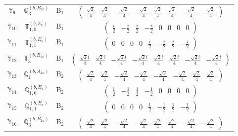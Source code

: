 \documentclass[fleqn,10pt,landscape]{article}
\begin{document}
\begin{itemize}
\begin{center}
\begin{longtable}{c|c|c|c}
$ \mathbb{Y}_{9} $ & $\mathbb{Q}_{3}^{(b,B_{2u})}$ & B$_{1}$ & $\begin{pmatrix} \frac{\sqrt{2}}{4} & \frac{\sqrt{2}}{4} & - \frac{\sqrt{2}}{4} & - \frac{\sqrt{2}}{4} & \frac{\sqrt{2}}{4} & \frac{\sqrt{2}}{4} & - \frac{\sqrt{2}}{4} & - \frac{\sqrt{2}}{4} \end{pmatrix}$ \\
$ \mathbb{Y}_{10} $ & $\mathbb{T}_{1,0}^{(b,E_{u})}$ & B$_{1}$ & $\begin{pmatrix} \frac{i}{2} & - \frac{i}{2} & \frac{i}{2} & - \frac{i}{2} & 0 & 0 & 0 & 0 \end{pmatrix}$ \\
$ \mathbb{Y}_{11} $ & $\mathbb{T}_{1,1}^{(b,E_{u})}$ & B$_{1}$ & $\begin{pmatrix} 0 & 0 & 0 & 0 & \frac{i}{2} & - \frac{i}{2} & \frac{i}{2} & - \frac{i}{2} \end{pmatrix}$ \\
$ \mathbb{Y}_{12} $ & $\mathbb{T}_{3}^{(b,B_{2u})}$ & B$_{1}$ & $\begin{pmatrix} \frac{\sqrt{2} i}{4} & \frac{\sqrt{2} i}{4} & - \frac{\sqrt{2} i}{4} & - \frac{\sqrt{2} i}{4} & \frac{\sqrt{2} i}{4} & \frac{\sqrt{2} i}{4} & - \frac{\sqrt{2} i}{4} & - \frac{\sqrt{2} i}{4} \end{pmatrix}$ \\ \hline
$ \mathbb{Y}_{13} $ & $\mathbb{Q}_{1}^{(b,A_{2u})}$ & B$_{2}$ & $\begin{pmatrix} \frac{\sqrt{2}}{4} & \frac{\sqrt{2}}{4} & - \frac{\sqrt{2}}{4} & - \frac{\sqrt{2}}{4} & - \frac{\sqrt{2}}{4} & - \frac{\sqrt{2}}{4} & \frac{\sqrt{2}}{4} & \frac{\sqrt{2}}{4} \end{pmatrix}$ \\
$ \mathbb{Y}_{14} $ & $\mathbb{Q}_{1,0}^{(b,E_{u})}$ & B$_{2}$ & $\begin{pmatrix} \frac{1}{2} & - \frac{1}{2} & \frac{1}{2} & - \frac{1}{2} & 0 & 0 & 0 & 0 \end{pmatrix}$ \\
$ \mathbb{Y}_{15} $ & $\mathbb{Q}_{1,1}^{(b,E_{u})}$ & B$_{2}$ & $\begin{pmatrix} 0 & 0 & 0 & 0 & \frac{1}{2} & - \frac{1}{2} & \frac{1}{2} & - \frac{1}{2} \end{pmatrix}$ \\
$ \mathbb{Y}_{16} $ & $\mathbb{Q}_{3}^{(b,B_{2u})}$ & B$_{2}$ & $\begin{pmatrix} \frac{\sqrt{2}}{4} & \frac{\sqrt{2}}{4} & - \frac{\sqrt{2}}{4} & - \frac{\sqrt{2}}{4} & \frac{\sqrt{2}}{4} & \frac{\sqrt{2}}{4} & - \frac{\sqrt{2}}{4} & - \frac{\sqrt{2}}{4} \end{pmatrix}$ \\

\end{longtable}
\end{center}
\end{itemize}
\end{document}
